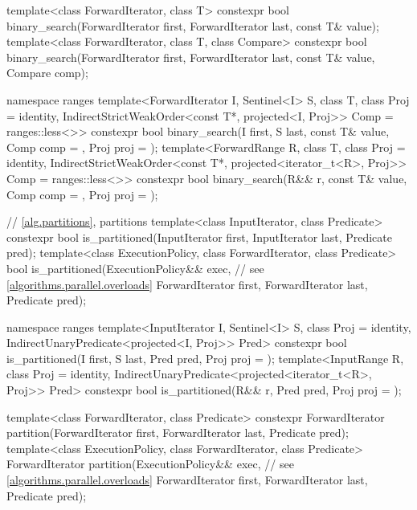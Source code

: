 \begin{codeblock}
{  template<class ForwardIterator, class T>
    constexpr bool
      binary_search(ForwardIterator first, ForwardIterator last,
                    const T& value);
  template<class ForwardIterator, class T, class Compare>
    constexpr bool
      binary_search(ForwardIterator first, ForwardIterator last,
                    const T& value, Compare comp);

  namespace ranges {
    template<ForwardIterator I, Sentinel<I> S, class T, class Proj = identity,
             IndirectStrictWeakOrder<const T*, projected<I, Proj>> Comp = ranges::less<>>
      constexpr bool binary_search(I first, S last, const T& value, Comp comp = {},
                                   Proj proj = {});
    template<ForwardRange R, class T, class Proj = identity,
             IndirectStrictWeakOrder<const T*, projected<iterator_t<R>, Proj>> Comp =
               ranges::less<>>
      constexpr bool binary_search(R&& r, const T& value, Comp comp = {},
                                   Proj proj = {});
  }

  // \ref{alg.partitions}, partitions
  template<class InputIterator, class Predicate>
    constexpr bool is_partitioned(InputIterator first, InputIterator last, Predicate pred);
  template<class ExecutionPolicy, class ForwardIterator, class Predicate>
    bool is_partitioned(ExecutionPolicy&& exec, // see \ref{algorithms.parallel.overloads}
                        ForwardIterator first, ForwardIterator last, Predicate pred);

  namespace ranges {
    template<InputIterator I, Sentinel<I> S, class Proj = identity,
             IndirectUnaryPredicate<projected<I, Proj>> Pred>
      constexpr bool is_partitioned(I first, S last, Pred pred, Proj proj = {});
    template<InputRange R, class Proj = identity,
             IndirectUnaryPredicate<projected<iterator_t<R>, Proj>> Pred>
      constexpr bool is_partitioned(R&& r, Pred pred, Proj proj = {});
  }

  template<class ForwardIterator, class Predicate>
    constexpr ForwardIterator partition(ForwardIterator first,
                                        ForwardIterator last,
                                        Predicate pred);
  template<class ExecutionPolicy, class ForwardIterator, class Predicate>
    ForwardIterator partition(ExecutionPolicy&& exec, // see \ref{algorithms.parallel.overloads}
                              ForwardIterator first,
                              ForwardIterator last,
                              Predicate pred);

}
\end{codeblock}
